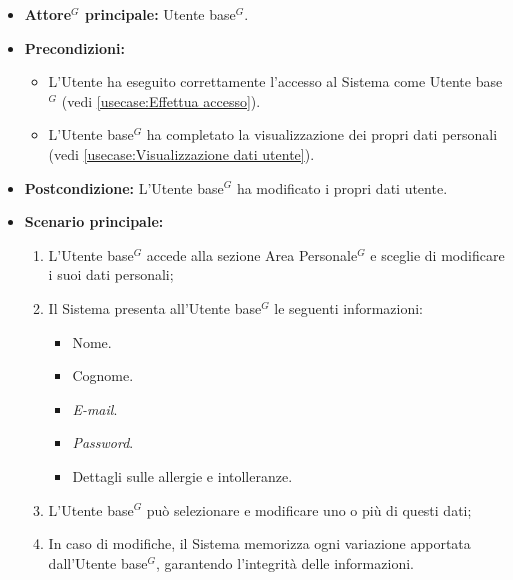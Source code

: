 \label{usecase:Modifica dati utente}
\begin{itemize}
	\item \textbf{\gls{Attore}$^G$ principale:} \gls{Utente base}$^G$.

	\item \textbf{Precondizioni:}
	      \begin{itemize}
		      \item L'Utente ha eseguito correttamente l'accesso al Sistema come \gls{Utente base}$^G$ (vedi \autoref{usecase:Effettua accesso}).
		      \item L'\gls{Utente base}$^G$ ha completato la visualizzazione dei propri
		            dati personali (vedi \autoref{usecase:Visualizzazione dati utente}).
	      \end{itemize}

	\item \textbf{Postcondizione:} L'\gls{Utente base}$^G$ ha modificato i propri dati utente.

	\item \textbf{Scenario principale:}
	      \begin{enumerate}
		      \item L'\gls{Utente base}$^G$ accede alla sezione Area Personale$^G$ e sceglie di modificare i suoi dati personali;
		      \item Il Sistema presenta all'\gls{Utente base}$^G$ le seguenti informazioni:
		            \begin{itemize}
			            \item Nome.
			            \item Cognome.
			            \item \textit{E-mail}.
			            \item \textit{Password}.
			            \item Dettagli sulle allergie e intolleranze.
		            \end{itemize}
		      \item L'\gls{Utente base}$^G$ può selezionare e modificare uno o più di questi dati;
		      \item In caso di modifiche, il Sistema memorizza ogni variazione apportata dall'\gls{Utente base}$^G$, garantendo l'integrità delle informazioni.
	      \end{enumerate}
\end{itemize}
